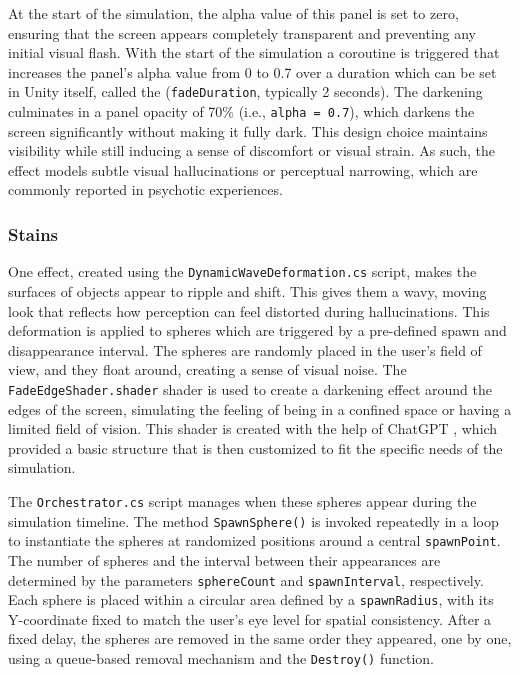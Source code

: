 At the start of the simulation, the alpha value of this panel is set to zero, ensuring that the screen appears completely transparent and preventing any initial visual flash. With the start of the simulation a coroutine is triggered that increases the panel’s alpha value from 0 to 0.7 over a duration which can be set in Unity itself, called the (\texttt{fadeDuration}, typically 2 seconds). The darkening culminates in a panel opacity of 70\% (i.e., \texttt{alpha = 0.7}), which darkens the screen significantly without making it fully dark. This design choice maintains visibility while still inducing a sense of discomfort or visual strain. As such, the effect models subtle visual hallucinations or perceptual narrowing, which are commonly reported in psychotic experiences. 

\subsubsection{Stains}
One effect, created using the \texttt{DynamicWaveDeformation.cs} script, makes the surfaces of objects appear to ripple and shift. This gives them a wavy, moving look that reflects how perception can feel distorted during hallucinations. This deformation is applied to spheres which are triggered by a pre-defined spawn and disappearance interval. The spheres are randomly placed in the user's field of view, and they float around, creating a sense of visual noise. The \texttt{FadeEdgeShader.shader} shader is used to create a darkening effect around the edges of the screen, simulating the feeling of being in a confined space or having a limited field of vision. This shader is created with the help of ChatGPT \cite{ChatGPT}, which provided a basic structure that is then customized to fit the specific needs of the simulation.

\vspace{1em}

The \texttt{Orchestrator.cs} script manages when these spheres appear during the simulation timeline. The method \texttt{SpawnSphere()} is invoked repeatedly in a loop to instantiate the spheres at randomized positions around a central \texttt{spawnPoint}. The number of spheres and the interval between their appearances are determined by the parameters \texttt{sphereCount} and \texttt{spawnInterval}, respectively. Each sphere is placed within a circular area defined by a \texttt{spawnRadius}, with its Y-coordinate fixed to match the user’s eye level for spatial consistency. After a fixed delay, the spheres are removed in the same order they appeared, one by one, using a queue-based removal mechanism and the \texttt{Destroy()} function. 

